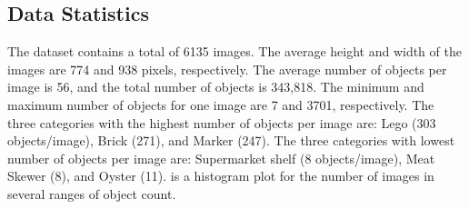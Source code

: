 \subsection{Data Statistics}
\iffalse
\vr{The statistics need to be changed in this section, text will remain unchanged.}
The dataset contains images from 148 categories. These categories can be roughly grouped to form super-categories: (i) People \& Animal (156 images); (ii) Apparel \& Cosmetic (133 images); (iii) Bottle, Box, \& Bag (129 images); (iv) Furniture and building elements (84 images); (v) Food \& Fruit (130 images); (vi) Toy \& Collectible (84 images); (vii) Office stationery (164 images); and (viii) Vehicle (49 images). \Fref{fig:categoryPlot} shows the categories and the super-categories together with the number of images for each category. 
\fi

The dataset contains a total of 6135 images. The average height and width of the images are 774 and 938 pixels, respectively. The average number of objects per image is 56, and the total number of objects is \mbox{343,818}. The minimum and maximum number of objects for one image are 7 and 3701, respectively. The three categories with the highest number of objects per image are: Lego (303 objects/image), Brick (271), and Marker (247). The three categories with lowest number of objects per image are: Supermarket shelf (8 objects/image), Meat Skewer (8), and Oyster (11).  is a histogram plot for the number of images in several ranges of object count. 

